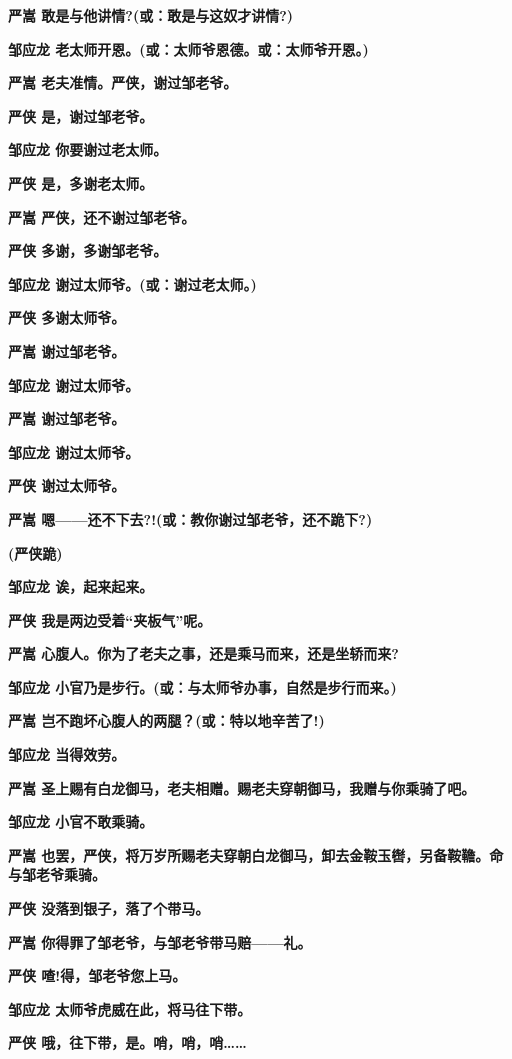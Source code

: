 \textbf{严嵩 敢是与他讲情?(或：敢是与这奴才讲情?)}

\textbf{邹应龙 老太师开恩。(或：太师爷恩德。或：太师爷开恩。)}

\textbf{严嵩 老夫准情。严侠，谢过邹老爷。}

\textbf{严侠 是，谢过邹老爷。}

\textbf{邹应龙 你要谢过老太师。}

\textbf{严侠 是，多谢老太师。}

\textbf{严嵩 严侠，还不谢过邹老爷。}

\textbf{严侠 多谢，多谢邹老爷。}

\textbf{邹应龙 谢过太师爷。(或：谢过老太师。)}

\textbf{严侠 多谢太师爷。}

\textbf{严嵩 谢过邹老爷。}

\textbf{邹应龙 谢过太师爷。}

\textbf{严嵩 谢过邹老爷。}

\textbf{邹应龙 谢过太师爷。}

\textbf{严侠 谢过太师爷。}

\textbf{严嵩 嗯------还不下去?!(或：教你谢过邹老爷，还不跪下?)}

\textbf{(严侠跪)}

\textbf{邹应龙 诶，起来起来。}

\textbf{严侠 我是两边受着``夹板气''呢。}

\textbf{严嵩 心腹人。你为了老夫之事，还是乘马而来，还是坐轿而来?}

\textbf{邹应龙 小官乃是步行。(或：与太师爷办事，自然是步行而来。)}

\textbf{严嵩 岂不跑坏心腹人的两腿？(或：特以地辛苦了!)}

\textbf{邹应龙 当得效劳。}

\textbf{严嵩
圣上赐有白龙御马，老夫相赠。赐老夫穿朝御马，我赠与你乘骑了吧。}

\textbf{邹应龙 小官不敢乘骑。}

\textbf{严嵩
也罢，严侠，将万岁所赐老夫穿朝白龙御马，卸去金鞍玉辔，另备鞍韂。命与邹老爷乘骑。}

\textbf{严侠 没落到银子，落了个带马。}

\textbf{严嵩 你得罪了邹老爷，与邹老爷带马赔------礼。}

\textbf{严侠 喳!得，邹老爷您上马。}

\textbf{邹应龙 太师爷虎威在此，将马往下带。}

\textbf{严侠 哦，往下带，是。哨，哨，哨\ldots{}\ldots{}}

